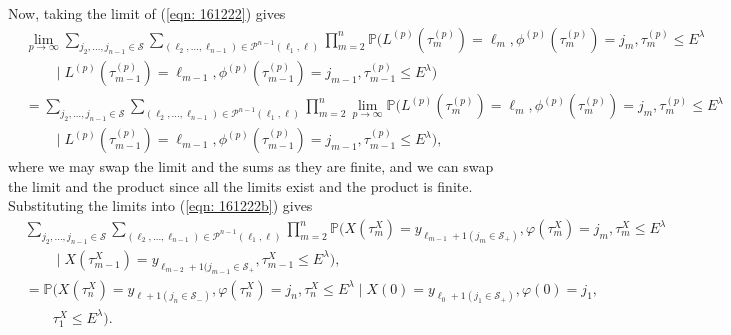 Now, taking the limit of (\ref{eqn: 161222}) gives 
\begin{align}
	&\lim_{p\to\infty}\sum_{j_2,\dots,j_{n-1}\in\mathcal S}\sum_{(\ell_2,\dots,\ell_{n-1}) \in\mathcal P^{n-1}(\ell_1,\ell)}\prod_{m=2}^{n}\mathbb P(L^{(p)}(\tau_m^{(p)}) = \ell_m, \phi^{(p)}(\tau_m^{(p)}) = j_m, \tau_{m}^{(p)}\leq E^\lambda \nonumber
            	 \\&\qquad\mid L^{(p)}(\tau_{m-1}^{(p)}) = \ell_{m-1}, 
	 	 \phi^{(p)}(\tau_{m-1}^{(p)}) = j_{m-1}, \tau_{m-1}^{(p)}\leq E^\lambda) \nonumber 
	\\ &=\sum_{j_2,\dots,j_{n-1}\in\mathcal S}\sum_{(\ell_2,\dots,\ell_{n-1}) \in\mathcal P^{n-1}(\ell_1,\ell)}\prod_{m=2}^{n}\lim_{p\to\infty} \mathbb P(L^{(p)}(\tau_m^{(p)}) = \ell_m, \phi^{(p)}(\tau_m^{(p)}) = j_m, \tau_{m}^{(p)}\leq E^\lambda \nonumber
            	 \\&\qquad \mid L^{(p)}(\tau_{m-1}^{(p)}) = \ell_{m-1}, 
	 	 \phi^{(p)}(\tau_{m-1}^{(p)}) = j_{m-1}, \tau_{m-1}^{(p)}\leq E^\lambda),
	 \label{eqn: 161222b}
\end{align}
where we may swap the limit and the sums as they are finite, and we can swap the limit and the product since all the limits exist and the product is finite. Substituting the limits into (\ref{eqn: 161222b}) gives 
\begin{align}
	&\sum_{j_2,\dots,j_{n-1}\in\mathcal S}\sum_{(\ell_2,\dots,\ell_{n-1})  \in\mathcal P^{n-1}(\ell_1,\ell)} \prod_{m=2}^{n}\mathbb P(X(\tau_m^X) = y_{\ell_{m-1}+1(j_{m}\in\mathcal S_+)}, \varphi(\tau_m^X) = j_m, \tau_{m}^X\leq E^\lambda \nonumber
            	\\&\qquad \mid X(\tau_{m-1}^X)=y_{\ell_{m-2}+1(j_{m-1}\in\mathcal S_+},\tau_{m-1}^X\leq E^\lambda),\nonumber
		\\&= \mathbb P(X(\tau_n^X) = y_{\ell+1(j_{n}\in\mathcal S_-)}, 
		\varphi(\tau_n^X) = j_n, \tau_{n}^X\leq E^\lambda \mid X(0)=y_{\ell_{0}+1(j_{1}\in\mathcal S_+)},
		\varphi(0)=j_{1},\nonumber 
		\\&\qquad{}\tau_1^X\leq E^\lambda).
\end{align}

